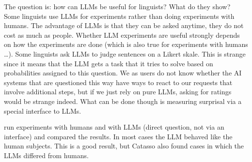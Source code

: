 The question is: how can LLMs be useful for linguists? What do they show? Some linguists use LLMs
for experiments rather than doing experiments with humans. The advantage of LLMs is that they can be
asked anytime, they do not cost as much as people. Whether LLM experiments are useful strongly
depends on how the experiments are done (which is also true for experiments with humans
\ldots). Some linguists ask LLMs to judge sentences on a Likert skale. This is strange since it
means that the LLM gets a task that it tries to solve based on probabilities assigned to this
question. We as users do not know whether the AI systems that are questioned this way have ways to
react to our requests that involve additional steps, but if we just rely on pure LLMs, asking for
ratings would be strange indeed. What can be done though is measuring surprisal via a special
interface to LLMs.

\citet{Catasso2026a-u} run experiments with humans and with LLMs (direct question, not via an
interface) and compared the results. In most cases the LLM behaved like the human subjects. This is
a good result, but Catasso also found cases in which the LLMs differed from
humans. 

